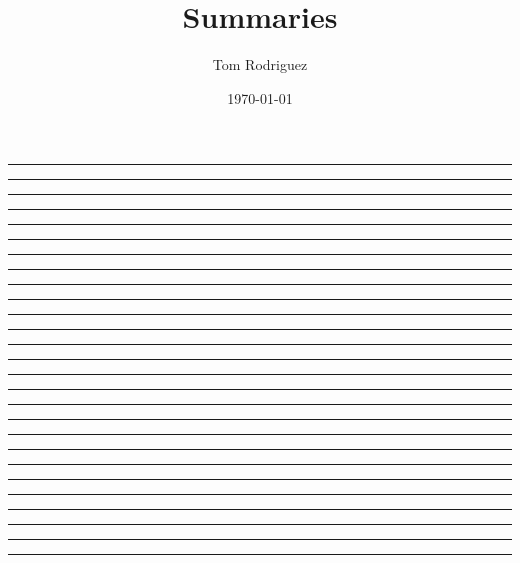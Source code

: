 \documentclass[10pt,landscape,a4paper]{article}
\title{Summaries}
\author{Tom Rodriguez}
\date{\today}
\begin{document}

\tiny

\begin{multicols*}{5}
\setlength{\columnseprule}{0.4pt}


\hrule

\hrule

\hrule

\hrule

\hrule

\hrule

\hrule

\hrule

\hrule

\hrule

\end{multicols*}
\newpage

\begin{multicols*}{5}
\setlength{\columnseprule}{0.4pt}


\hrule

\hrule

\hrule

\hrule

\end{multicols*}
\newpage

\setcounter{section}{0}

\begin{multicols*}{5}
\setlength{\columnseprule}{0.4pt}


\hrule

\hrule

\hrule

\hrule

\hrule

\hrule 

 
\vspace{.8mm}
\hrule


\newpage

\hrule

\hrule

\hrule

\hrule

\hrule
% 

\hrule

\end{multicols*}
\end{document}
